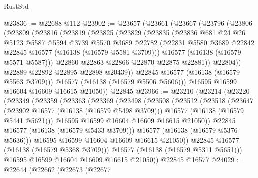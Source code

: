 \begin{lexlean}{RustStd}
\begin{coremodule}
@23836 := @22688 @112
@23902 := @23657
    (@23661
      (@23667
        (@23796
          (@23806
            (@23809
              (@23816
                (@23819
                  (@23825
                    (@23829
                      (@23835
                        (@23836
                          @681
                          @24
                          @26
                          @5123
                          @5587
                          @5594
                          @3739
                          @5570
                          @3689
                          @22782
                          (@22831 @5580 @3689 @22842 @22845 @16577 (@16138 (@16579 @5581 @3709)))
                          @16577
                          (@16138 (@16579 @5571 @5587)))
                        @22860
                        @22863
                        @22866
                        @22870
                        @22875
                        @22881))
                    @22804))
                @22889
                @22892
                @22895
                @22898
                @20439))
            @22845
            @16577
            (@16138 (@16579 @5563 @3709)))
          @16577
          (@16138 (@16579 @5506 @5606)))
        @16595
        @16599
        @16604
        @16609
        @16615
        @21050))
    @22845
@23966 := @23210
    (@23214
      (@23220
        (@23349
          (@23359
            (@23363
              (@23369
                (@23498
                  (@23508
                    (@23512
                      (@23518
                        (@23647
                          (@23902 @16577 (@16138 (@16579 @5498 @3709)))
                          @16577
                          (@16138 (@16579 @5441 @5621)))
                        @16595
                        @16599
                        @16604
                        @16609
                        @16615
                        @21050))
                    @22845
                    @16577
                    (@16138 (@16579 @5433 @3709)))
                  @16577
                  (@16138 (@16579 @5376 @5636)))
                @16595
                @16599
                @16604
                @16609
                @16615
                @21050))
            @22845
            @16577
            (@16138 (@16579 @5368 @3709)))
          @16577
          (@16138 (@16579 @5311 @5651)))
        @16595
        @16599
        @16604
        @16609
        @16615
        @21050))
    @22845
    @16577
@24029 := @22644
    (@22662
      (@22673
        (@22677

\end{coremodule}
\end{lexlean}
